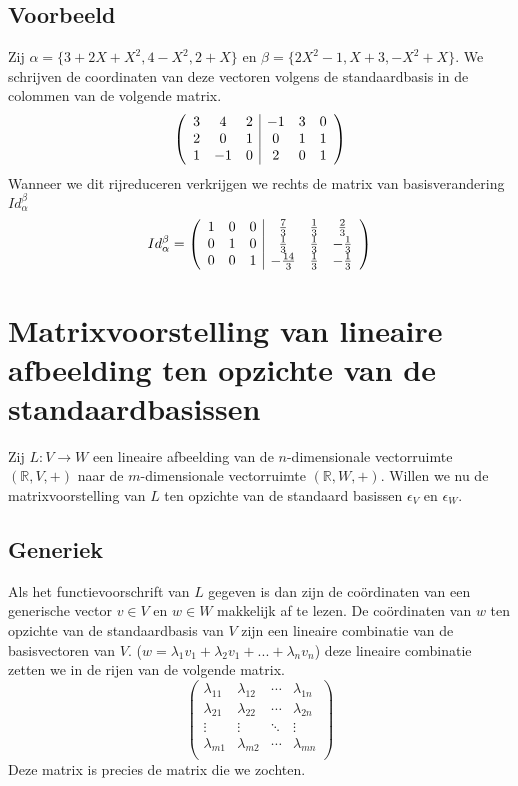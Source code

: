\documentclass[lineaire_algebra_oplossingen.tex]{subfiles}
\begin{document}
\subsection*{Voorbeeld}
Zij $\alpha = \{3+2X+X^2,4-X^2,2+X\}$ en $\beta = \{2X^2-1,X+3,-X^2+X\}$.
We schrijven de coordinaten van deze vectoren volgens de standaardbasis in de colommen van de volgende matrix.
\[
\left(
\begin{array}{c c c | c c c}
3 & 4 & 2 & -1 & 3 & 0\\
2 & 0 & 1 & 0 & 1 & 1\\
1 & -1 & 0 & 2 & 0 & 1\\
\end{array}
\right)
\]
Wanneer we dit rijreduceren verkrijgen we rechts de matrix van basisverandering $Id_\alpha^\beta$
\[
Id_\alpha^\beta =
\left(
\begin{array}{c c c | c c c}
1 & 0 & 0 & \frac{7}{3} & \frac{1}{3} & \frac{2}{3}\\
0 & 1 & 0 & \frac{1}{3} & \frac{1}{3} & -\frac{1}{3}\\
0 & 0 & 1 & -\frac{14}{3} & \frac{1}{3} & -\frac{1}{3}\\
\end{array}
\right)
\]


\section{Matrixvoorstelling van lineaire afbeelding ten opzichte van de standaardbasissen}
Zij $L:V\rightarrow W$ een lineaire afbeelding van de $n$-dimensionale vectorruimte $(\mathbb{R},V,+)$ naar de $m$-dimensionale vectorruimte $(\mathbb{R},W,+)$. Willen we nu de matrixvoorstelling van $L$ ten opzichte van de standaard basissen $\epsilon_V$ en $\epsilon_W$.

\subsection*{Generiek}
Als het functievoorschrift van $L$ gegeven is dan zijn de co\"ordinaten van een generische vector $v\in V$ en $w\in W$ makkelijk af te lezen.
De co\"ordinaten van $w$ ten opzichte van de standaardbasis van $V$ zijn een lineaire combinatie van de basisvectoren van $V$. ($w = \lambda_1v_1+\lambda_2v_1+...+\lambda_nv_n$) deze lineaire combinatie zetten we in de rijen van de volgende matrix.
\[
\begin{pmatrix}
\lambda_{11} & \lambda_{12} & \cdots & \lambda_{1n} \\
\lambda_{21} & \lambda_{22} & \cdots & \lambda_{2n} \\
\vdots & \vdots & \ddots & \vdots\\
\lambda_{m1} & \lambda_{m2} & \cdots & \lambda_{mn} \\
\end{pmatrix}
\]
Deze matrix is precies de matrix die we zochten.
\end{document}
